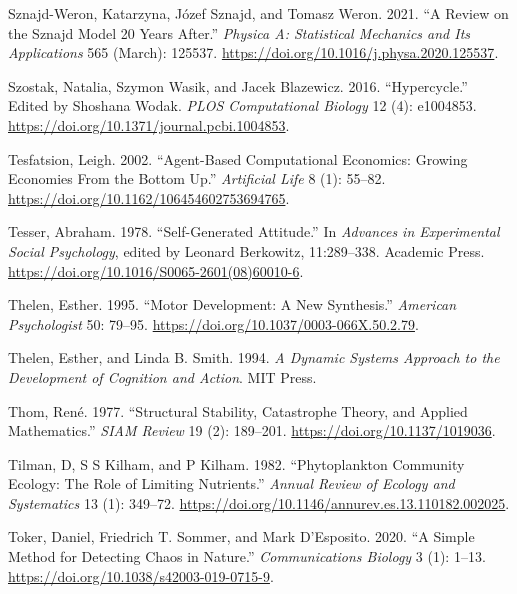 \documentclass[
  letterpaper,
]{scrbook}
\newlength{\cslhangindent}
\newlength{\cslentryspacingunit} %
\newenvironment{CSLReferences}[2] %
 {%
  \setlength{\parindent}{0pt}
  \ifodd #1
  \let\oldpar\par
  \def\par{\hangindent=\cslhangindent\oldpar}
  \fi
  \setlength{\parskip}{#2\cslentryspacingunit}
 }%
 {}
\begin{document}
\begin{CSLReferences}{1}{0}
\leavevmode{}%
Sznajd-Weron, Katarzyna, Józef Sznajd, and Tomasz Weron. 2021. {``A
Review on the {Sznajd} Model \textemdash{} 20 Years After.''}
\emph{Physica A: Statistical Mechanics and Its Applications} 565
(March): 125537. \url{https://doi.org/10.1016/j.physa.2020.125537}.

\leavevmode{}%
Szostak, Natalia, Szymon Wasik, and Jacek Blazewicz. 2016.
{``Hypercycle.''} Edited by Shoshana Wodak. \emph{PLOS Computational
Biology} 12 (4): e1004853.
\url{https://doi.org/10.1371/journal.pcbi.1004853}.

\leavevmode{}%
Tesfatsion, Leigh. 2002. {``Agent-{Based Computational Economics}:
{Growing Economies From} the {Bottom Up}.''} \emph{Artificial Life} 8
(1): 55--82. \url{https://doi.org/10.1162/106454602753694765}.

\leavevmode{}%
Tesser, Abraham. 1978. {``Self-{Generated Attitude}.''} In
\emph{Advances in {Experimental Social Psychology}}, edited by Leonard
Berkowitz, 11:289--338. {Academic Press}.
\url{https://doi.org/10.1016/S0065-2601(08)60010-6}.

\leavevmode{}%
Thelen, Esther. 1995. {``Motor Development: {A} New Synthesis.''}
\emph{American Psychologist} 50: 79--95.
\url{https://doi.org/10.1037/0003-066X.50.2.79}.

\leavevmode{}%
Thelen, Esther, and Linda B. Smith. 1994. \emph{A {Dynamic Systems
Approach} to the {Development} of {Cognition} and {Action}}. {MIT
Press}.

\leavevmode{}%
Thom, René. 1977. {``Structural {Stability}, {Catastrophe Theory}, and
{Applied Mathematics}.''} \emph{SIAM Review} 19 (2): 189--201.
\url{https://doi.org/10.1137/1019036}.

\leavevmode{}%
Tilman, D, S S Kilham, and P Kilham. 1982. {``Phytoplankton {Community
Ecology}: {The Role} of {Limiting Nutrients}.''} \emph{Annual Review of
Ecology and Systematics} 13 (1): 349--72.
\url{https://doi.org/10.1146/annurev.es.13.110182.002025}.

\leavevmode{}%
Toker, Daniel, Friedrich T. Sommer, and Mark D'Esposito. 2020. {``A
Simple Method for Detecting Chaos in Nature.''} \emph{Communications
Biology} 3 (1): 1--13. \url{https://doi.org/10.1038/s42003-019-0715-9}.


\end{CSLReferences}
\end{document}
